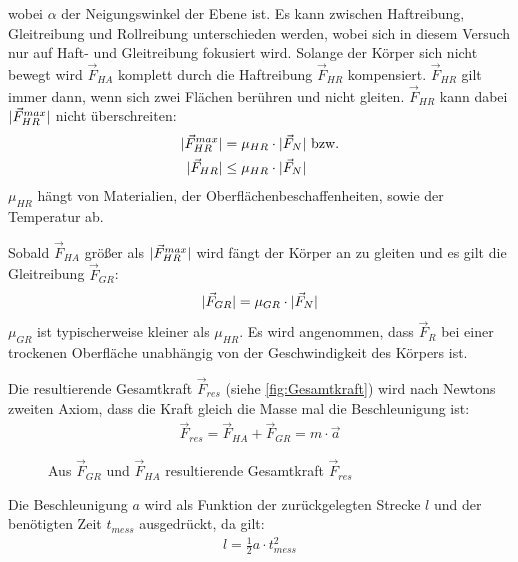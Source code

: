 wobei $\alpha$ der Neigungswinkel der Ebene ist.
Es kann zwischen Haftreibung, Gleitreibung und Rollreibung unterschieden werden, wobei sich in diesem Versuch nur auf Haft- und Gleitreibung fokusiert wird.
\newline
Solange der Körper sich nicht bewegt wird $\vec{F}_{HA}$ komplett durch die Haftreibung $\vec{F}_{HR}$ kompensiert. $\vec{F}_{HR}$ gilt immer dann, wenn sich zwei Flächen berühren und nicht gleiten. $\vec{F}_{HR}$ kann dabei $\lvert\vec{F}_{HR}^{max}\rvert$ nicht überschreiten:
\begin{subequations}
    \begin{align}
        \lvert\vec{F}_{HR}^{max}\rvert &= \mu_{HR} \cdot \lvert\vec{F}_{N}\rvert \text{ bzw.}\\
        \lvert\vec{F}_{HR}\rvert &\leq \mu_{HR} \cdot \lvert\vec{F}_{N}\rvert
    \end{align}
    \label{eq:F_HR}
\end{subequations}
$\mu_{HR}$ hängt von Materialien, der Oberflächenbeschaffenheiten, sowie der Temperatur ab. \newline

Sobald $\vec{F}_{HA}$ größer als $\lvert\vec{F}_{HR}^{max}\rvert$ wird fängt der Körper an zu gleiten und es gilt die Gleitreibung $\vec{F}_{GR}$:
\begin{align}
    \lvert\vec{F}_{GR}\rvert = \mu_{GR} \cdot \lvert\vec{F}_{N}\rvert
    \label{eq:F_GR}
\end{align}
$\mu_{GR}$ ist typischerweise kleiner als $\mu_{HR}$. Es wird angenommen, dass $\vec{F}_{R}$ bei einer trockenen Oberfläche unabhängig von der Geschwindigkeit des Körpers ist.\smallskip

Die resultierende Gesamtkraft $\vec{F}_{res}$ (siehe \autoref{fig:Gesamtkraft}) wird nach Newtons zweiten Axiom, dass die Kraft gleich die Masse mal die Beschleunigung ist:
\begin{align}
    \vec{F}_{res} = \vec{F}_{HA} + \vec{F}_{GR} = m \cdot \vec{a}
\end{align}

\begin{figure}[ht]
    \centering
    
    \caption[Resultierende Gesamtkraft]{Aus $\vec{F}_{GR}$ und $\vec{F}_{HA}$ resultierende Gesamtkraft $\vec{F}_{res}$ \cite{schiefeEbene:Fromme}}
    \label{fig:Gesamtkraft}
\end{figure}

Die Beschleunigung $a$ wird als Funktion der zurückgelegten Strecke $l$ und der benötigten Zeit $t_{mess}$ ausgedrückt, da gilt:
\begin{align}
    l = \frac{1}{2} a \cdot t_{mess}^2
\end{align}